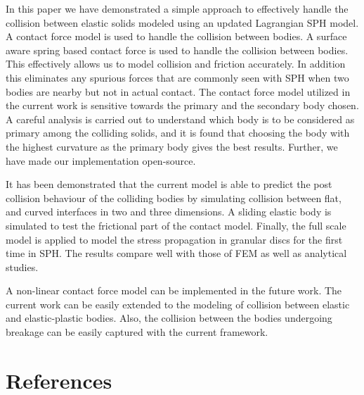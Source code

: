 \documentclass[preprint,12pt]{elsarticle}
\begin{document}
In this paper we have demonstrated a simple approach to effectively handle the
collision between elastic solids modeled using an updated Lagrangian SPH
model. A contact force model is used to handle the collision between bodies. A
surface aware spring based contact force is used to handle the collision
between bodies. This effectively allows us to model collision and friction
accurately. In addition this eliminates any spurious forces that are commonly
seen with SPH when two bodies are nearby but not in actual contact. The
contact force model utilized in the current work is sensitive towards the
primary and the secondary body chosen. A careful analysis is carried out to
understand which body is to be considered as primary among the colliding
solids, and it is found that choosing the body with the highest curvature as
the primary body gives the best results. Further, we have made our
implementation open-source.

It has been demonstrated that the current model is able to predict the post
collision behaviour of the colliding bodies by simulating collision between
flat, and curved interfaces in two and three dimensions. A sliding elastic
body is simulated to test the frictional part of the contact model. Finally,
the full scale model is applied to model the stress propagation in granular
discs for the first time in SPH. The results compare well with those of FEM as
well as analytical studies.

A non-linear contact force model can be implemented in the future work. The
current work can be easily extended to the modeling of collision between
elastic and elastic-plastic bodies. Also, the collision between the bodies
undergoing breakage can be easily captured with the current framework.

\section*{References}




\end{document}
